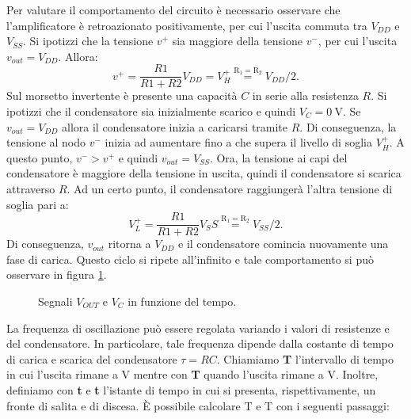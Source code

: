 \noindent
Per valutare il comportamento del circuito è necessario osservare che l'amplificatore è retroazionato positivamente, per cui l'uscita commuta tra $V_{DD}$ e $V_{SS}$. Si ipotizzi che la tensione $v^+$ sia maggiore della tensione $v^-$, per cui l'uscita $v_{out} = V_{DD}$. Allora:
\begin{equation}
	v^+ = \frac{R1}{R1+R2} V_{DD} = V_H^+\overset{\mathrm{R_1=R_2}}{=}V_{DD}/2.
\end{equation}
Sul morsetto invertente è presente una capacità $C$ in serie alla resistenza $R$. Si ipotizzi che il condensatore sia inizialmente scarico e quindi $V_C = \SI{0}{\volt}$. Se $v_{out} = V_{DD}$ allora il condensatore inizia a caricarsi tramite $R$. Di conseguenza, la tensione al nodo $v^-$ inizia ad aumentare fino a che supera il livello di soglia $V_H^+$. A questo punto, $v^- > v^+$ e quindi $v_{out} = V_{SS}$. Ora, la tensione ai capi del condensatore è maggiore della tensione in uscita, quindi il condensatore si scarica attraverso $R$. Ad un certo punto, il condensatore raggiungerà l'altra tensione di soglia pari a:
\begin{equation}
	V_L^+ = \frac{R1}{R1+R2} V_SS\overset{\mathrm{R_1=R_2}}{=}V_{SS}/2.
\end{equation}
Di conseguenza, $v_{out}$ ritorna a $V_{DD}$ e il condensatore comincia nuovamente una fase di carica. Questo ciclo si ripete all'infinito e tale comportamento si può osservare in figura \ref{fig:oscillatore}.

\begin{figure}[h!]
	\centering
	\caption{Segnali $V_{OUT}$ e $V_C$ in funzione del tempo.}
	\label{fig:oscillatore}
\end{figure}



La frequenza di oscillazione può essere regolata variando i valori di resistenze e del condensatore. In particolare, tale frequenza dipende dalla costante di tempo di carica e scarica del condensatore $\tau=RC$. Chiamiamo \textbf{T} l'intervallo di tempo in cui l'uscita rimane a V mentre con \textbf{T} quando l'uscita rimane a V. Inoltre, definiamo con \textbf{t} e \textbf{t} l'istante di tempo in cui si presenta, rispettivamente, un fronte di salita e di discesa. \`E possibile calcolare T e T con i seguenti passaggi:

